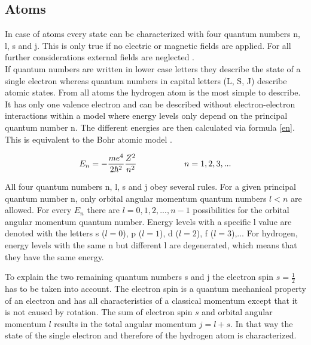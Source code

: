 \documentclass[parskip,12pt,headsepline,a4paper] {scrbook}
\begin{document}
\subsection{Atoms}
\vspace{-1\baselineskip}
In case of atoms every state can be characterized with four quantum numbers n, l, s and j. This is only true if no electric or magnetic fields are applied. For all further considerations external fields are neglected \cite{demtr3}. \\
If quantum numbers are written in lower case letters they describe the state of a single electron whereas quantum numbers in capital letters (L, S, J) describe atomic states.
From all atoms the hydrogen atom is the most simple to describe. It has only one valence electron and can be described without electron-electron interactions within a model where energy levels only depend on the principal quantum number n. The different energies are then calculated via formula \ref{en}. This is equivalent to the Bohr atomic model \cite{vdl-fqm}.

\begin{align}  \label{en}
E_n = - \frac{m e^4}{2 \hbar^2} \frac{Z^2}{n^2} \hspace{2 cm} n = 1,2,3,...
\end{align}

All four quantum numbers n, l, s and j obey several rules. For a given principal quantum number n, only orbital angular momentum quantum numbers $l < n$ are allowed. For every $E_n$ there are $l=0,1,2,...,n-1$ possibilities for the orbital angular momentum quantum number. Energy levels with a specific l value are denoted with the letters s ($l=0$), p ($l=1$), d ($l=2$), f ($l=3$),... For hydrogen, energy levels with the same n but different l are degenerated, which means that they have the same energy.

To explain the two remaining quantum numbers s and j the electron spin $s= \frac{1}{2}$ has to be taken into account. The electron spin is a quantum mechanical property of an electron and has all characteristics of a classical momentum except that it is not caused by rotation. The sum of electron spin $s$ and orbital angular momentum $l$ results in the total angular momentum $j = l + s$. In that way the state of the single electron and therefore of the hydrogen atom is characterized.
\end{document}
